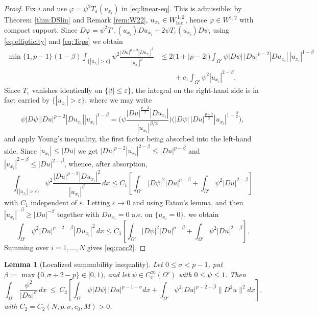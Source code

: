 \documentclass[reqno]{amsart}
\theoremstyle{plain}
\newtheorem{lemma}[theorem]{Lemma}
\theoremstyle{definition}
\theoremstyle{remark}
\newcommand{\eps}{\varepsilon}
\begin{document}
\begin{proof}
Fix $i$ and use $\varphi=\psi^2T_\eps(u_{x_i})$ in \eqref{eq:linear-eq}. This is admissible: by
Theorem \ref{thm:DSlin} and Remark \ref{rem:W22}, $u_{x_i}\in W^{1,2}_{\rm loc}$, hence
$\varphi\in W^{1,2}$ with compact support. Since
$D\varphi=\psi^2T'_\eps(u_{x_i})Du_{x_i}+2\psi T_\eps(u_{x_i})D\psi$, using \eqref{eq:ellipticity}
and \eqref{eq:Teps} we obtain
\begin{align*}
\min\{1,p-1\}(1-\beta)\int_{\{|u_{x_i}|>\eps\}}\psi^2\frac{|Du|^{p-2}|Du_{x_i}|^2}{|u_{x_i}|^{\beta}}
&\le 2\big(1+|p-2|\big)\int_{\Omega'}\psi|D\psi|\,|Du|^{p-2}|Du_{x_i}|\,|u_{x_i}|^{1-\beta}\\
&\qquad+c_1\int_{\Omega'}\psi^2|u_{x_i}|^{2-\beta} .
\end{align*}
Since $T_\eps$ vanishes identically on $\{|t|\le\eps\}$, the integral on the right-hand side is in
fact carried by $\{|u_{x_i}|>\eps\}$, where we may write
\[
\psi|D\psi||Du|^{p-2}|Du_{x_i}||u_{x_i}|^{1-\beta}
=\Big(\psi\frac{|Du|^{\frac{p-2}{2}}|Du_{x_i}|}{|u_{x_i}|^{\beta/2}}\Big)
\Big(|D\psi|\,|Du|^{\frac{p-2}{2}}|u_{x_i}|^{1-\frac\beta2}\Big),
\]
and apply Young's inequality, the first factor being absorbed into the left-hand side.
Since $|u_{x_i}|\le|Du|$ we get $|Du|^{p-2}|u_{x_i}|^{2-\beta}\le|Du|^{p-\beta}$ and
$|u_{x_i}|^{2-\beta}\le|Du|^{2-\beta}$, whence, after absorption,
\[
\int_{\{|u_{x_i}|>\eps\}}\psi^2\frac{|Du|^{p-2}|Du_{x_i}|^2}{|u_{x_i}|^{\beta}}\,dx\le
C_1\left[\int_{\Omega'}|D\psi|^2|Du|^{p-\beta}+\int_{\Omega'}\psi^2|Du|^{2-\beta}\right]
\]
with $C_1$ independent of $\eps$. Letting $\eps\to0$ and using Fatou's lemma, and then
$|u_{x_i}|^{-\beta}\ge|Du|^{-\beta}$ together with $Du_{x_i}=0$ a.e. on $\{u_{x_i}=0\}$, we obtain
\[
\int_{\Omega'}\psi^2|Du|^{p-2-\beta}|Du_{x_i}|^2\,dx\le
C_1\left[\int_{\Omega'}|D\psi|^2|Du|^{p-\beta}+\int_{\Omega'}\psi^2|Du|^{2-\beta}\right].
\]
Summing over $i=1,\dots,N$ gives \eqref{eq:cacc2}.
\end{proof}

\begin{lemma}[Localized summability inequality]\label{lem:cacc1}
Let $0\le\sigma<p-1$, put $\beta:=\max\{0,\sigma+2-p\}\in[0,1)$, and let $\psi\in C_c^\infty(\Omega')$
with $0\le\psi\le1$. Then
\begin{equation}\label{eq:cacc1}
\int_{\Omega'}\frac{\psi^2}{|Du|^{\sigma}}\,dx\ \le\ C_2\left[\int_{\Omega'}\psi|D\psi|\,|Du|^{p-1-\sigma}dx
+\int_{\Omega'}\psi^2|Du|^{p-2-\beta}\|D^2u\|^2dx\right],
\end{equation}
with $C_2=C_2(N,p,\sigma,c_0,M)>0$.
\end{lemma}
\end{document}
